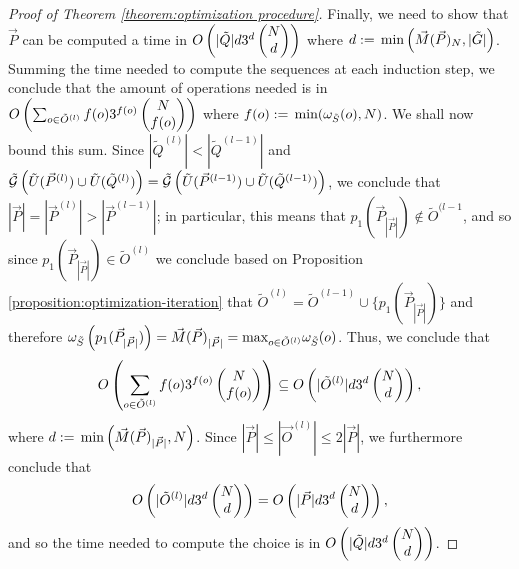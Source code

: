 \documentclass[twocolumn,showpacs,preprintnumbers,amsmath,amssymb,nofootinbib,pra,floatfix]{revtex4-1}
\newcommand{\lst}{\vec}
\newcommand{\set}{\tilde}
\newcommand{\genfun}{\tilde{\mathcal{G}}}
\begin{document}
\begin{proof}[Proof of Theorem \ref{theorem:optimization procedure}]
Finally, we need to show that $\lst P$ can be computed a time in $O\paren{|\set Q| d 3^{d}\choose{N}{d}}$ where $d:=\min\paren{\lst M(\lst P)_N,|\set G|}$.  Summing the time needed to compute the sequences at each induction step, we conclude that the amount of operations needed is in $O\paren{\sum_{o\in\set O^{(l)}} f(o) 3^{f(o)}\choose{N}{f(o)}}$ where $f(o):=\min(\om_{\set S}(o),N)$.  We shall now bound this sum.  Since $|\set Q^{(l)}|<|\set Q^{(l-1)}|$ and $\genfun\paren{\set U(\lst P^{(l)})\cup\set U(\set Q^{(l)})}=\genfun\paren{\set U(\lst P^{(l-1)})\cup\set U(\set Q^{(l-1)})}$, we conclude that $|\lst P|=|\lst P^{(l)}|>|\lst P^{(l-1)}|$;  in particular, this means that $p_1(\lst P_{|\lst P|})\notin \set O^{(l-1}$, and so since $p_1(\lst P_{|\lst P|})\in \set O^{(l)}$ we conclude based on Proposition \ref{proposition:optimization-iteration} that $\set O^{(l)}=\set O^{(l-1)}\cup\{p_1(\lst P_{|\lst P|})\}$ and therefore $\om_{\set S}\paren{p_1(\lst P_{|\lst P|})}=\lst M(\lst P)_{|\lst P|}=\max_{o\in\set O^{(l)}}\om_{\set S}(o)$.  Thus, we conclude that
$$O\paren{\sum_{o\in\set O^{(l)}} f(o) 3^{f(o)}\choose{N}{f(o)}}\subseteq O\paren{|\set O^{(l)}| d 3^{d}\choose{N}{d}},$$ where $d:=\min \paren{\lst M(\lst P)_{|\lst P|},N}$.  Since $|\lst P|\le|\lst O^{(l)}|\le 2|\lst P|$, we furthermore conclude that
$$O\paren{|\set O^{(l)}| d 3^{d}\choose{N}{d}}= O\paren{|\lst P| d 3^{d}\choose{N}{d}},$$
and so the time needed to compute the choice is in $O\paren{|\set Q| d 3^{d}\choose{N}{d}}$.
\end{proof}
\end{document}
